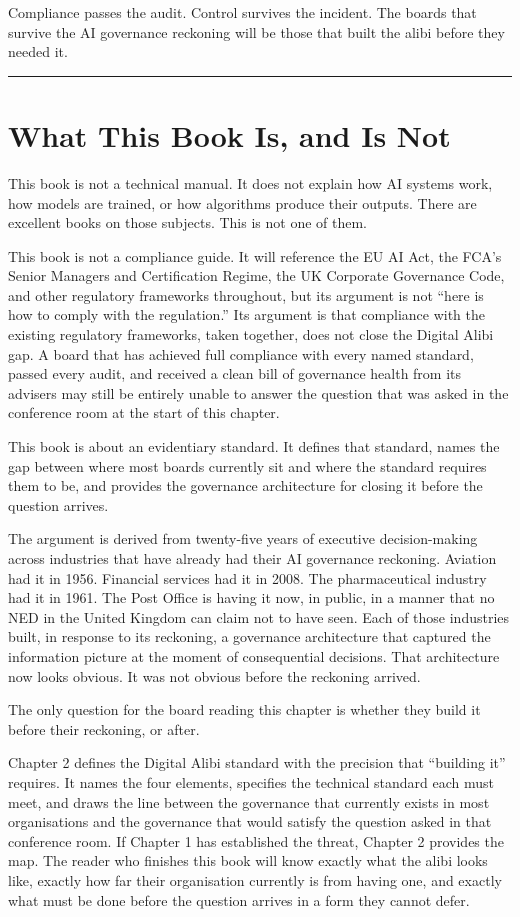 Compliance passes the audit. Control survives the incident. The boards that survive the AI governance reckoning will be those that built the alibi before they needed it.

\begin{center}\rule{0.5\linewidth}{0.5pt}\end{center}

\section{What This Book Is, and Is Not}

This book is not a technical manual. It does not explain how AI systems work, how models are trained, or how algorithms produce their outputs. There are excellent books on those subjects. This is not one of them.

This book is not a compliance guide. It will reference the EU AI Act, the FCA's Senior Managers and Certification Regime, the UK Corporate Governance Code, and other regulatory frameworks throughout, but its argument is not ``here is how to comply with the regulation.'' Its argument is that compliance with the existing regulatory frameworks, taken together, does not close the Digital Alibi gap. A board that has achieved full compliance with every named standard, passed every audit, and received a clean bill of governance health from its advisers may still be entirely unable to answer the question that was asked in the conference room at the start of this chapter.

This book is about an evidentiary standard. It defines that standard, names the gap between where most boards currently sit and where the standard requires them to be, and provides the governance architecture for closing it before the question arrives.

The argument is derived from twenty-five years of executive decision-making across industries that have already had their AI governance reckoning. Aviation had it in 1956. Financial services had it in 2008. The pharmaceutical industry had it in 1961. The Post Office is having it now, in public, in a manner that no NED in the United Kingdom can claim not to have seen. Each of those industries built, in response to its reckoning, a governance architecture that captured the information picture at the moment of consequential decisions. That architecture now looks obvious. It was not obvious before the reckoning arrived.

The only question for the board reading this chapter is whether they build it before their reckoning, or after.

Chapter 2 defines the Digital Alibi standard with the precision that ``building it'' requires. It names the four elements, specifies the technical standard each must meet, and draws the line between the governance that currently exists in most organisations and the governance that would satisfy the question asked in that conference room. If Chapter 1 has established the threat, Chapter 2 provides the map. The reader who finishes this book will know exactly what the alibi looks like, exactly how far their organisation currently is from having one, and exactly what must be done before the question arrives in a form they cannot defer.
